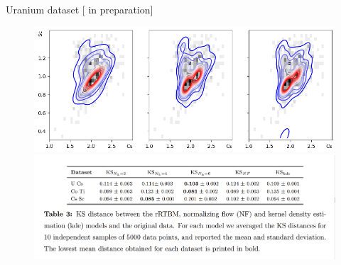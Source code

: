 \documentclass[10pt]{beamer}
\begin{document}
\begin{frame}{Uranium dataset \hfill \small [\cite{new} in preparation]}

    \begin{figure}
        \includegraphics[scale=0.5]{figures/uranium56.png}
        \includegraphics[scale=0.2]{figures/Screenshot from 2022-09-04 16-47-05.png}
    \end{figure}
    
    
\end{frame}
\end{document}
